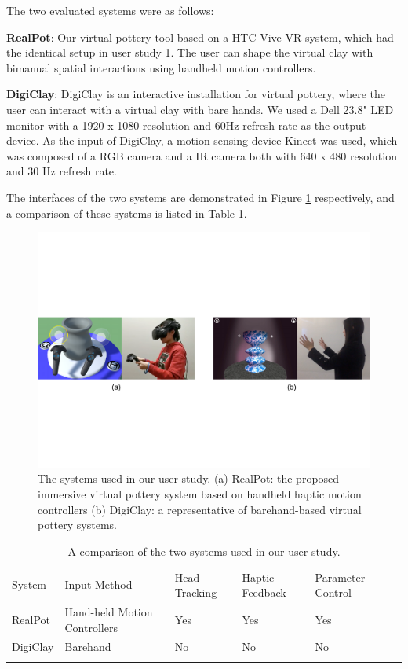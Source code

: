 \documentclass{svjour3}                     %
\begin{document}
{The two evaluated systems were as follows:

\textbf{RealPot}: Our virtual pottery tool based on a HTC Vive VR system, which had the identical setup in user study 1. The user can shape the virtual clay with bimanual spatial interactions using handheld motion controllers. 

\textbf{DigiClay}: DigiClay is an interactive installation for virtual pottery, where the user can interact with a virtual clay with bare hands.
We used a Dell 23.8" LED monitor with a 1920 x 1080 resolution and 60Hz refresh rate as the output device.
As the input of DigiClay, a motion sensing device Kinect was used, which was composed of a RGB camera and a IR camera both with 640 x 480 resolution and 30 Hz refresh rate.

The interfaces of the two systems are demonstrated in Figure \ref{fig:sys} respectively, and a comparison of these systems is listed in Table \ref{tab:sys}. 


\begin{figure}
\includegraphics[width=\textwidth]{fig13}
\caption{The systems used in our user study. (a) RealPot: the proposed immersive virtual pottery system based on handheld haptic motion controllers (b) DigiClay: a representative of barehand-based virtual pottery systems.}
\label{fig:sys}
\end{figure}


\begin{table}
\caption{A comparison of the two systems used in our user study.}
\label{tab:sys}       %
\begin{tabular}{llllll}
\hline\noalign{\smallskip}
System & Input Method & Head Tracking & Haptic Feedback & Parameter Control \\
\noalign{\smallskip}\hline\noalign{\smallskip}
RealPot & Hand-held Motion Controllers & Yes & Yes & Yes\\
DigiClay & Barehand & No & No & No\\
\noalign{\smallskip}\hline
\end{tabular}
\end{table}


}
\end{document}
